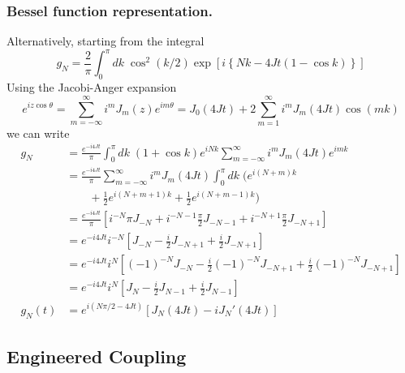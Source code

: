 \documentclass[../../../main.tex]{subfiles}
\begin{document}
\subsubsection{Bessel function representation.}
Alternatively, starting from the integral
\begin{equation*}
  g_N = \frac{2 }{\pi} \int_{0} ^{\pi} dk\; \cos^2 (k/2) \exp \left[i \left\{Nk - 4Jt (1-\cos k)  \right\}  \right]
\end{equation*}
Using the Jacobi-Anger expansion
\begin{equation*}
  e^{i z \cos\theta} = \sum_{m=-\infty}^{\infty} i^{m} J_{m}(z)e^{i m \theta}
  = J_0(4Jt) + 2 \sum_{m=1}^{\infty} i^m J_m(4Jt) \cos(mk)
\end{equation*}
we can write
\begin{align*}
  g_N
   & = \frac{e^{-i4Jt}}{\pi}\int_{0}^{\pi} dk\;(1+\cos k) e^{iNk}\sum_{m=-\infty}^{\infty} i^{m} J_{m}(4Jt)e^{i m k}                   \\
   & = \frac{e^{-i4Jt}}{\pi} \sum_{m=-\infty}^{\infty} i^{m} J_{m}(4Jt) \int_{0}^{\pi} dk\; \big( e ^{i(N+m)k}                         \\
   & \qquad + \frac{1}{2}e ^{i(N+m+1)k} + \frac{1 }{2 } e ^{i(N+m-1)k}  \big)                                                          \\
   & = \frac{e^{-i4Jt}}{\pi} \left[ i ^{-N}\pi J_{-N}+ i ^{-N-1} \frac{\pi }{2 } J_{-N-1}+  i ^{-N+1} \frac{\pi }{2 } J_{-N+1} \right] \\
   & = e^{-i4Jt} i ^{-N} \left[ J_{-N} -  \frac{i }{2 } J_{-N+1} + \frac{i }{2 } J_{-N+1} \right]                                      \\
   & = e^{-i4Jt} i ^{N} \left[(-1)^{-N} J_{-N} -  \frac{i }{2 }(-1)^{-N} J_{-N+1} + \frac{i }{2 }(-1)^{-N} J_{-N+1} \right]            \\
   & = e^{-i4Jt} i ^{N} \left[ J_{N} -  \frac{i }{2 } J_{N-1} + \frac{i }{2 }J_{N-1} \right]                                           \\
  g_N(t)
   & = e^{i(N\pi/2 -4Jt)}  \left[ J_{N}(4Jt) -i  J_N' (4Jt)\right]
\end{align*}

\subsection{Engineered Coupling}
\end{document}
